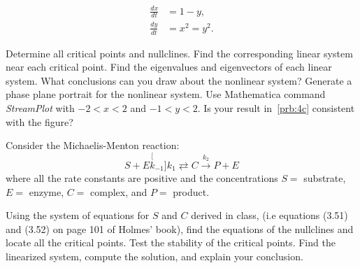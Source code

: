 \documentclass[
    number={7},
]{math486homework}
\begin{document}
\begin{problems}
\begin{equation*}
    \begin{aligned}
       \frac{dx}{dt} &= 1 - y,\\
       \frac{dy}{dt} &= x^{2} = y^{2}.
    \end{aligned}
    \end{equation*}
    \begin{problems}
       \subproblem Determine all critical points and nullclines. 
       \subproblem Find the corresponding linear system near each critical point. 
       \subproblem Find the eigenvalues and eigenvectors of each linear system.
       What conclusions can you draw about the nonlinear system? 
       \subproblem Generate a phase plane portrait for the nonlinear system.
       Use Mathematica command \textit{StreamPlot} with $-2 < x < 2$ and $-1 < y < 2$.
       Is your result in~\ref{prb:4c} consistent with the figure? 
    \end{problems}
    \problem Consider the Michaelis-Menton reaction:
    \[ S + E \stackrel[k_{-1}]{k_{1}}{\rightleftarrows} C \stackrel{k_{2}}{\rightarrow} P + E \]
    where all the rate constants are positive and the concentrations $S = $ substrate, $E = $ enzyme, $C = $ complex, and $P = $ product.
    \begin{problems}
       \subproblem Using the system of equations for $S$ and $C$ derived in class, (i.e equations (3.51) and (3.52) on page 101 of Holmes' book), find the equations of the nullclines and locate all the critical points. 
       \subproblem Test the stability of the critical points.
       Find the linearized system, compute the solution, and explain your conclusion. 
    \end{problems}
\end{problems}
\end{document}
